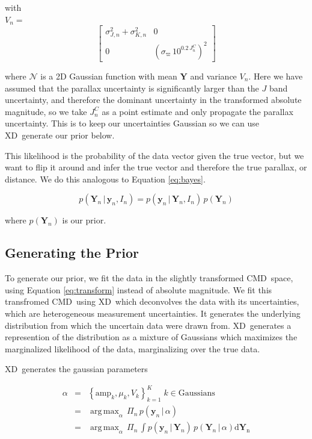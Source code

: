 \documentclass[modern]{aastex61}
\newcommand{\acronym}[1]{{\small{#1}}}
\newcommand{\xd}{\acronym{XD}}
\newcommand{\cmd}{\acronym{CMD}}
\DeclareMathOperator*{\argmax}{arg\,max}
\newcommand{\given}{\,|\,}
\begin{document}
with \\
$V_n = $
\[
\begin{bmatrix}
\sigma_{J,n}^2 + \sigma_{K,n}^2 & 0 \\
0 & (\sigma_{\varpi}\,10^{0.2\,J_n^C})^2
\end{bmatrix}
\]


where $\mathcal{N}$ is a 2D Gaussian function with mean $\mathbf{Y}$ and variance $V_n$.
Here we have assumed that the parallax uncertainty is significantly larger than the $J$ band uncertainty, and therefore the dominant uncertainty in the transformed absolute magnitude, so we take $J_n^C$ as a point estimate and only propagate the parallax uncertainty. This is to keep our uncertainties Gaussian so we can use \xd\ generate our prior below.

This likelihood is the probability of the data vector given the true vector, but we
want to flip it around and infer the true vector and therefore the true parallax, or distance. We do this
analogous to Equation \ref{eq:bayes}.


\begin{equation}
p(\mathbf{Y}_n \given \mathbf{y}_n, I_n) = p(\mathbf{y}_n \given \mathbf{Y}_n, I_n) \, p(\mathbf{Y}_n)
\end{equation}

where $p(\mathbf{Y}_n)$ is our prior.

\subsection{Generating the Prior}

To generate our prior, we fit the data in the slightly transformed \cmd\ space, using Equation \ref{eq:transform} instead of absolute magnitude. We fit this transfromed \cmd\ using \xd\ which deconvolves the data with its uncertainties, which are heterogeneous measurement uncertainties. It generates the underlying distribution from which the uncertain data were drawn from. \xd\ generates a represention of the distribution as a mixture of Gaussians which maximizes the marginalized likelihood of the data, marginalizing over the true data.

\xd\ generates the gaussian parameters

\begin{eqnarray}
\alpha &=& \left\{\mathrm{amp}_k, \mu_k, V_k\right\}_{k=1}^K \; k \in \mathrm{Gaussians} \nonumber\\
       &=& \argmax_{\alpha} \, \Pi_n \, p(\mathbf{y}_n \given \alpha) \nonumber\\
       &=& \argmax_{\alpha} \, \Pi_n \, \int p(\mathbf{y}_n \given \mathbf{Y}_n) \, p(\mathbf{Y}_n \given \alpha)\mathrm{d\mathbf{Y}_n}
\label{eq:xdmml}
\end{eqnarray}
\end{document}
